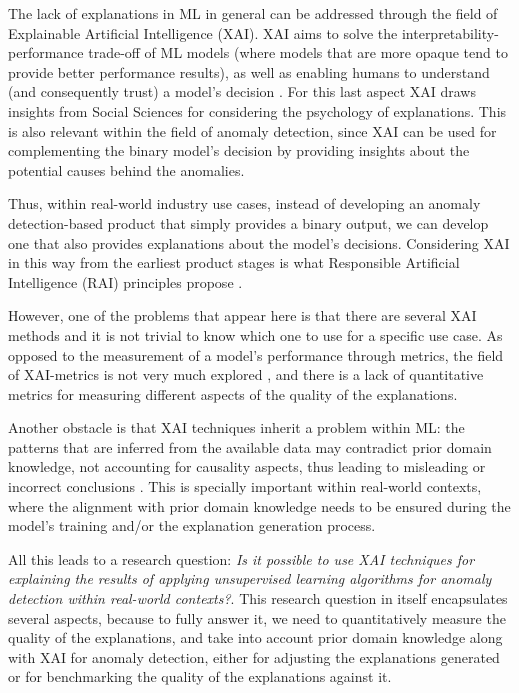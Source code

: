 The lack of explanations in ML in general can be addressed through the field of Explainable Artificial Intelligence (XAI). XAI aims to solve the interpretability-performance trade-off of ML models (where models that are more opaque tend to provide better performance results), as well as enabling humans to understand (and consequently trust) a model's decision \parencite{arrieta2020explainable}. For this last aspect XAI draws insights from Social Sciences for considering the psychology of explanations. This is also relevant within the field of anomaly detection, since XAI can be used for complementing the binary model's decision by providing insights about the potential causes behind the anomalies.

Thus, within real-world industry use cases, instead of developing an anomaly detection-based product that simply provides a binary output, we can develop one that also provides explanations about the model's decisions. Considering XAI in this way from the earliest product stages is what Responsible Artificial Intelligence (RAI) principles propose \parencite{benjamins2019responsible}.

However, one of the problems that appear here is that there are several XAI methods and it is not trivial to know which one to use for a specific use case. As opposed to the measurement of a model's performance through metrics, the field of XAI-metrics is not very much explored \parencite{arrieta2020explainable}, and there is a lack of quantitative metrics for measuring different aspects of the quality of the explanations. 

Another obstacle is that XAI techniques inherit a problem within ML: the patterns that are inferred from the available data may contradict prior domain knowledge, not accounting for causality aspects, thus leading to misleading or incorrect conclusions \parencite{beckh2021explainable}. This is specially important within real-world contexts, where the alignment with prior domain knowledge needs to be ensured during the model's training and/or the explanation generation process. 

All this leads to a research question: \textit{Is it possible to use XAI techniques for explaining the results of applying unsupervised learning algorithms for anomaly detection within real-world contexts?}. This research question in itself encapsulates several aspects, because to fully answer it, we need to quantitatively measure the quality of the explanations, and take into account prior domain knowledge along with XAI for anomaly detection, either for adjusting the explanations generated or for benchmarking the quality of the explanations against it.

